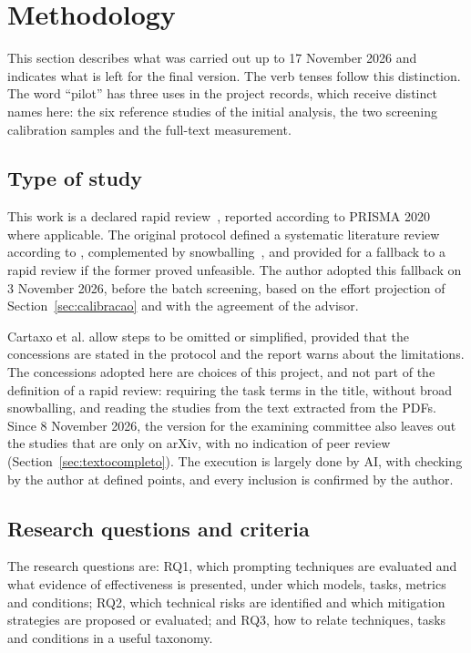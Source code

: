 \section{Methodology}\label{sec:metodologia}
This section describes what was carried out up to 17 November 2026 and indicates what is left for the final version. The verb
tenses follow this distinction. The word ``pilot'' has three uses in the project records, which receive
distinct names here: the six reference studies of the initial analysis, the two screening
calibration samples and the full-text measurement.

\subsection{Type of study}
This work is a declared rapid review~\citep{cartaxo2020rapid}, reported according to PRISMA
2020~\citep{page2021prisma} where applicable. The original protocol defined a systematic literature
review according to \citet{kitchenham2015ebse}, complemented by
snowballing~\citep{wohlin2014snowballing}, and provided for a fallback to a rapid review if the former
proved unfeasible. The author adopted this fallback on 3 November 2026, before the batch screening, based on the effort
projection of Section~\ref{sec:calibracao} and with the agreement of the advisor.

Cartaxo et al. allow steps to be omitted or simplified, provided that the concessions are stated in the protocol and the
report warns about the limitations. The concessions adopted here are choices of this project, and not part of the
definition of a rapid review: requiring the task terms in the title, without broad snowballing, and reading
the studies from the text extracted from the PDFs. Since 8 November 2026, the version for the examining committee also leaves out the studies
that are only on arXiv, with no indication of peer review (Section~\ref{sec:textocompleto}). The execution is largely done by AI, with checking by the
author at defined points, and every inclusion is confirmed by the author.

\subsection{Research questions and criteria}
The research questions are: RQ1, which prompting techniques are evaluated and what evidence of
effectiveness is presented, under which models, tasks, metrics and conditions; RQ2, which technical
risks are identified and which mitigation strategies are proposed or evaluated; and RQ3, how to
relate techniques, tasks and conditions in a useful taxonomy.

